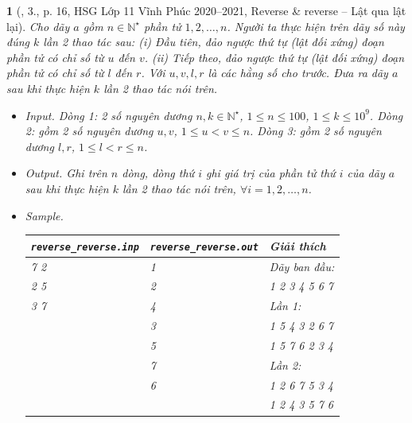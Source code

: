 \documentclass{article}
\newtheorem{baitoan}{}
\begin{document}
\begin{baitoan}[\cite{Trung_HSG_THPT_Tin}, 3., p. 16, HSG Lớp 11 Vĩnh Phúc 2020--2021, Reverse \& reverse -- Lật qua lật lại]
	Cho dãy $a$ gồm $n\in\mathbb{N}^\star$ phần tử $1,2,\ldots,n$. Người ta thực hiện trên dãy số này đúng $k$ lần 2 thao tác sau: (i) Đầu tiên, đảo ngược thứ tự (lật đối xứng) đoạn phần tử có chỉ số từ $u$ đến $v$. (ii) Tiếp theo, đảo ngược thứ tự (lật đối xứng) đoạn phần tử có chỉ số từ $l$ đến $r$. Với $u,v,l,r$ là các hằng số cho trước. Đưa ra dãy $a$ sau khi thực hiện $k$ lần 2 thao tác nói trên.
	\begin{itemize}
		\item {\sf Input.} Dòng 1: 2 số nguyên dương $n,k\in\mathbb{N}^\star$, $1\le n\le100$, $1\le k\le10^9$. Dòng 2: gồm 2 số nguyên dương $u,v$, $1\le u < v\le n$. Dòng 3: gồm 2 số nguyên dương $l,r$, $1\le l < r\le n$.
		\item {\sf Output.} Ghi trên $n$ dòng, dòng thứ $i$ ghi giá trị của phần tử thứ $i$ của dãy $a$ sau khi thực hiện $k$ lần 2 thao tác nói trên, $\forall i = 1,2,\ldots,n$.
		\item {\sf Sample.}
		\begin{table}[H]
			\centering
			\begin{tabular}{|l|l|l|}
				\hline
				\verb|reverse_reverse.inp| & \verb|reverse_reverse.out| & Giải thích\\
				\hline
				7 2 & 1 & Dãy ban đầu: \\
				2 5 & 2 & 1 2 3 4 5 6 7 \\
				3 7 & 4 & Lần 1: \\
				& 3 & 1 \textit{5 4 3 2} 6 7 \\
				& 5 & 1 5 \textit{7 6 2 3 4} \\
				& 7 & Lần 2: \\
				& 6 & 1 \textit{2 6 7 5} 3 4 \\
				& & 1 2 4 3 5 7 6 \\
				\hline
			\end{tabular}
		\end{table}
	\end{itemize}
\end{baitoan}
\end{document}
